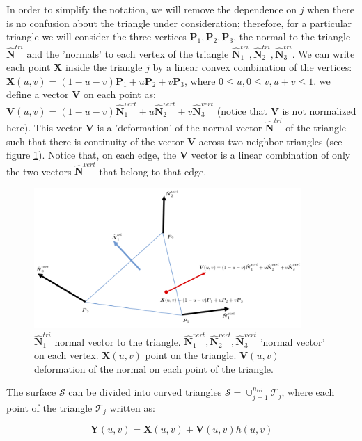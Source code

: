 \documentclass[11pt, oneside]{article}
\newcommand\bP{\boldsymbol P}
\newcommand\bN{\boldsymbol N}
\newcommand\bX{\boldsymbol X}
\newcommand\bY{\boldsymbol Y}
\newcommand\bV{\boldsymbol V}
\begin{document}
In order to simplify the notation, we will remove the dependence on $j$ when there is no confusion about the triangle under consideration; therefore, for a particular triangle  we will consider the three vertices $\bP_1,\bP_2,\bP_3$, the normal to the triangle $\hat{\bN}^{tri}$ and the 'normals' to each vertex of the triangle $\hat{\bN}_1^{tri},\hat{\bN}_2^{tri},\hat{\bN}_3^{tri}$. We can write each point $\bX$ inside the triangle $j$ by a linear convex combination of the vertices: $\bX(u,v)=(1-u-v)\bP_1+u\bP_2+v\bP_3$, where $0\le u, 0\le v, u+v\le1$. we define a vector $\bV$ on each point as: $\bV(u,v)=(1-u-v)\hat{\bN}_1^{vert}+u\hat{\bN}_2^{vert}+v\hat{\bN}_3^{vert}$ (notice that $\bV$ is not normalized here). This vector $\bV$ is a 'deformation' of the normal vector $\hat{\bN}^{tri}$ of the triangle such that there is continuity of the vector $\bV$ across two neighbor triangles (see figure \ref{normalvert3}). Notice that, on each edge, the $\bV$ vector is a linear combination of only the two vectors $\hat{\bN}^{vert}$  that belong to that edge.

\begin{figure}[H]
\begin{center}
\includegraphics[width=4in]{normal_vertex_3.png}%
\end{center}
\caption{$\hat{\bN}_1^{tri}$ normal vector to the triangle. $\hat{\bN}_1^{vert},\hat{\bN}_2^{vert},\hat{\bN}_3^{vert}$ 'normal vector' on each vertex. $\bX(u,v)$ point on the triangle. $\bV(u,v)$ deformation of the normal on each point of the triangle.}
\label{normalvert3}
\end{figure}


The surface $\mathcal{S}$ can be divided into curved triangles $\mathcal{S}=\cup_{j=1}^{n_{tri}}\mathcal{T}_j$, where each point of the triangle $\mathcal{T}_j$ written as:

\begin{equation}\label{chart0}
\bY(u,v)=\bX(u,v)+\bV(u,v)h(u,v)
\end{equation}
\end{document}
